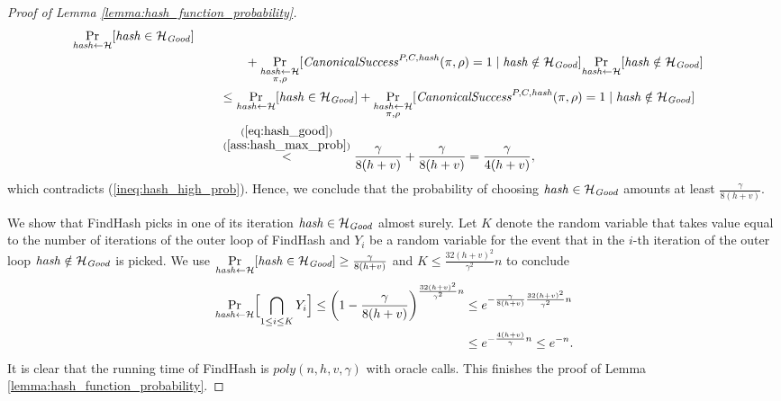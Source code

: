 \begin{proof}[Proof of Lemma \ref{lemma:hash_function_probability}]
\begin{align*}
  \underset{\operatorname{\mathit{hash}} \leftarrow \mathcal{H}}{\Pr}[\operatorname{\mathit{hash}} \in \mathcal{H}_{\mathit{Good}}] \\
  & \mbox\qquad\qquad + \underset{\substack{\operatorname{\mathit{hash}} \leftarrow \mathcal{H} \\ \pi, \rho}}{\Pr}[\operatorname{\mathit{CanonicalSuccess}}^{P,C,\operatorname{\mathit{hash}}}(\pi, \rho) = 1 \mid \operatorname{\mathit{hash}} \notin \mathcal{H}_{\mathit{Good}}]
  \underset{\operatorname{\mathit{hash}} \leftarrow \mathcal{H}}{\Pr}[\operatorname{\mathit{hash}} \notin \mathcal{H}_{\mathit{Good}}] \\
  & \mbox\qquad \leq \underset{\operatorname{\mathit{hash}} \leftarrow \mathcal{H}}{\Pr}[\operatorname{\mathit{hash}} \in \mathcal{H}_{\mathit{Good}}] +
  \underset{\substack{\operatorname{\mathit{hash}} \leftarrow \mathcal{H} \\ \pi, \rho}}{\Pr}[\operatorname{\mathit{CanonicalSuccess}}^{P,C,\operatorname{\mathit{hash}}}(\pi, \rho) = 1 \mid \operatorname{\mathit{hash}} \notin \mathcal{H}_{\mathit{Good}}] \\
  & \mbox\qquad  \stackrel{\substack{ (\ref{eq:hash_good}) \\ (\ref{ass:hash_max_prob})}}{<} \frac{\gamma}{8(h+v)} + \frac{\gamma}{8(h+v)} = \frac{\gamma}{4(h+v)},
\end{align*}
which contradicts (\ref{ineq:hash_high_prob}). Hence, we conclude that the probability of choosing $\operatorname{\mathit{hash}} \in \mathcal{H}_{\mathit{Good}}$ amounts at least $\frac{\gamma}{8(h+v)}$.

We show that FindHash picks in one of its iteration $\operatorname{\mathit{hash}} \in \mathcal{H}_{\mathit{Good}}$ almost surely.
Let $K$ denote the random variable that takes value equal to the number of iterations of
the outer loop of FindHash and $Y_i$ be a random variable for the event
that in the $i$-th iteration of the outer loop $\operatorname{\mathit{hash}} \notin \mathcal{H}_{\mathit{Good}}$ is picked.
We use $\underset{\operatorname{\mathit{hash}} \leftarrow \mathcal{H}}{\Pr}[\operatorname{\mathit{hash}} \in \mathcal{H}_{\textit{Good}}] \geq \frac{\gamma}{8(h+v)}$ and $K \leq \frac{32(h+v)^2}{\gamma^2}n$ to conclude
\begin{align*}
  \underset{\operatorname{\mathit{hash}} \leftarrow \mathcal{H}}{\Pr}\Bigl[ \bigcap_{1 \leq i \leq K} Y_i \Bigr] \leq \left(1 - \frac{\gamma}{8(h+v)}\right)^{\frac{32(h+v)^2}{\gamma^2}n}
    &\leq e^{-\frac{\gamma}{8(h+v)} \frac{32(h+v)^2}{\gamma^2}n} \\
    &\leq e^{-\frac{4(h+v)}{\gamma}n} \leq e^{-n}.
\end{align*}
It is clear that the running time of FindHash is $\mathit{poly}(n,h,v,\gamma)$ with oracle calls.
This finishes the proof of Lemma \ref{lemma:hash_function_probability}.
\end{proof}

